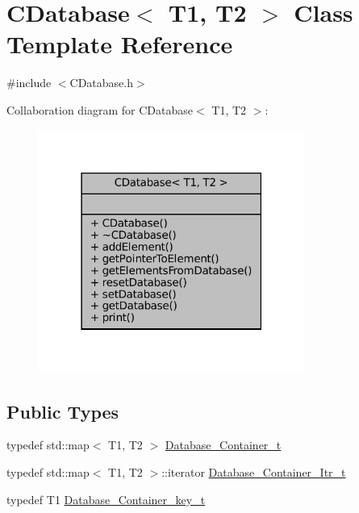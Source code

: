 \hypertarget{classCDatabase}{}\section{C\+Database$<$ T1, T2 $>$ Class Template Reference}
\label{classCDatabase}


{\ttfamily \#include $<$C\+Database.\+h$>$}



Collaboration diagram for C\+Database$<$ T1, T2 $>$\+:
\nopagebreak
\begin{figure}[H]
\begin{center}
\leavevmode
\includegraphics[width=247pt]{classCDatabase__coll__graph}
\end{center}
\end{figure}
\subsection*{Public Types}
\begin{DoxyCompactItemize}
\item 
typedef std\+::map$<$ T1, T2 $>$ \hyperlink{classCDatabase_ac20411b7c5997877aebb46d0bd3a8461}{Database\+\_\+\+Container\+\_\+t}
\item 
typedef std\+::map$<$ T1, T2 $>$\+::iterator \hyperlink{classCDatabase_a07aa3db528b07931347d91ebf505b8ed}{Database\+\_\+\+Container\+\_\+\+Itr\+\_\+t}
\item 
typedef T1 \hyperlink{classCDatabase_aa48e663caabc489e9aa738e299d10ee0}{Database\+\_\+\+Container\+\_\+key\+\_\+t}
\end{DoxyCompactItemize}
